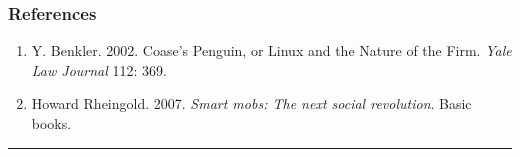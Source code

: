\hypertarget{references}{%
\subsubsection{References}\label{references}}

\begin{enumerate}
\def\labelenumi{\arabic{enumi}.}
\item
  Y. Benkler. 2002. Coase's Penguin, or Linux and the Nature of the
  Firm. \emph{Yale Law Journal} 112: 369.
\item
  Howard Rheingold. 2007. \emph{Smart mobs: The next social revolution}.
  Basic books.
\end{enumerate}

\begin{center}\rule{0.5\linewidth}{0.5pt}\end{center}
